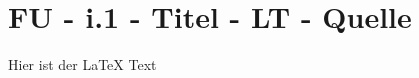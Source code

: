 \section{FU - i.1 - Titel - LT - Quelle}

\begin{beispiel}[FU]{1}
Hier ist der LaTeX Text
\end{beispiel}